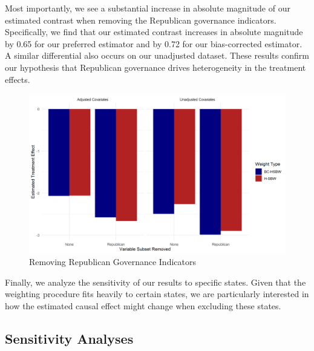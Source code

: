 \documentclass[12pt]{article}
\begin{document}
Most importantly, we see a substantial increase in absolute magnitude of our estimated contrast when removing the Republican governance indicators. Specifically, we find that our estimated contrast increases in absolute magnitude by 0.65 for our preferred estimator and by 0.72 for our bias-corrected estimator. A similar differential also occurs on our unadjusted dataset. These results confirm our hypothesis that Republican governance drives heterogeneity in the treatment effects.

\begin{figure}[]
\begin{center}
    \includegraphics[scale=0.6]{01_Plots/republican-constrast-c1.png}
    \caption{Removing Republican Governance Indicators}
    \label{repub}
\end{center}
\end{figure}

Finally, we analyze the sensitivity of our results to specific states. Given that the weighting procedure fits heavily to certain states, we are particularly interested in how the estimated causal effect might change when excluding these states.

\subsection{Sensitivity Analyses}
\end{document}

